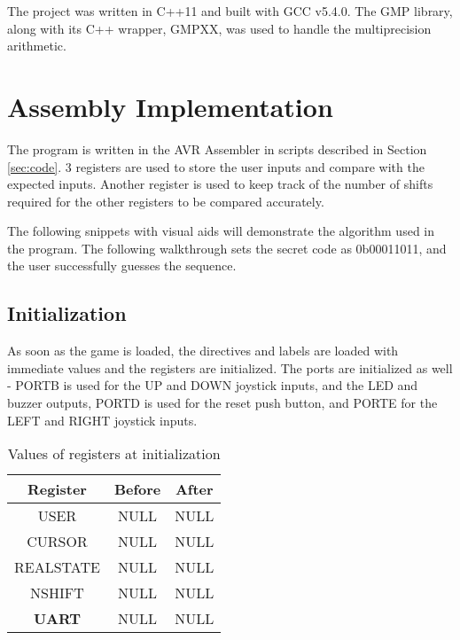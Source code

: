 \documentclass[usletter, 12pt]{article}
\begin{document}
        The project was written in C++11 and built with GCC v5.4.0. The GMP library, along with its C++ wrapper, GMPXX, was used to handle the multiprecision arithmetic.
        \iffalse
        \begin{figure}[ht]
            \begin{center}
                \texttt{[image: figures/state\_diagram.png]}
                \caption{State Diagram Implementation of the Game with the Secret Code Mapped to 0b00011011} \label{fig:state_diagram}
            \end{center}
        \end{figure}
        \fi

    \section{Assembly Implementation}

        The program is written in the AVR Assembler in scripts described in Section \ref{sec:code}. 3 registers are used to store the user inputs and compare with the expected inputs. Another register is used to keep track of the number of shifts required for the other registers to be compared accurately.

        The following snippets with visual aids will demonstrate the algorithm used in the program. The following walkthrough sets the secret code as 0b00011011, and the user successfully guesses the sequence.

        \subsection{Initialization}
            As soon as the game is loaded, the directives and labels are loaded with immediate values and the registers are initialized. The ports are initialized as well - PORTB is used for the UP and DOWN joystick inputs, and the LED and buzzer outputs, PORTD is used for the reset push button, and PORTE for the LEFT and RIGHT joystick inputs.

            \begin{table}[h]
                \caption{Values of registers at initialization}
                \centering
                \begin{tabular*}{200pt}{@{\extracolsep{\fill}} c c c}

                \textbf{Register} & \textbf{Before} & \textbf{After} \\
                \hline
                USER & NULL  & NULL \\
                CURSOR & NULL & NULL \\
                REALSTATE & NULL & NULL \\
                NSHIFT & NULL & NULL \\
                \hline
                \textbf{UART} & NULL & NULL \\
                \end{tabular*}
            \end{table}
\end{document}
